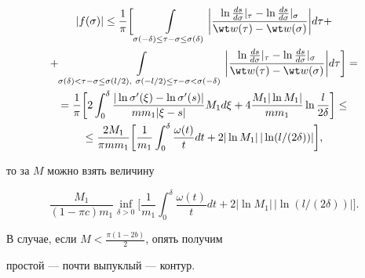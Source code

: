 \begin{multline*}


|f(\sigma)| \leq \frac{1}{\pi} \bigg[ \int\limits_{\sigma(- \delta) \leq\tau


- \sigma \leq \sigma(\delta)} \bigg| \frac{\ln


\frac{ds}{d\sigma}|_{\tau} - \ln


\frac{ds}{d\sigma}|_{\sigma}}{\wt w(\tau) - \wt w(\sigma)} \bigg|


d\tau + \\


%


+ \int\limits_{\sigma(\delta) < \tau - \sigma \leq \sigma(l/2),


\ \sigma(-l/2) \leq \tau-\sigma < \sigma(- \delta)}


\bigg| \frac{\ln \frac{ds}{d\sigma}|_{\tau} -


\ln \frac{ds}{d\sigma}|_{\sigma}}{\wt w(\tau) -


\wt w(\sigma)} \bigg| d\tau \bigg] = \\


%


= \frac {1}{\pi} \bigg[ 2\int_0^{\delta} \frac{|\ln \sigma'(\xi)


- \ln \sigma'(s)|}{m m_1 |\xi - s|} M_1 d\xi +


4 \frac{M_1 |\ln M_1|}{m m_1} \ln \frac{l}{2\delta} \bigg] \leq \\


%


\leq \frac{2 M_1}{\pi m m_1}


\bigg[ \frac{1}{m_1}\int_0^{\delta}\frac{\omega(t)}{t} dt


+ 2|\ln M_1|\, |\ln(l/(2\delta))| \bigg],


\end{multline*}


то за $M$ можно взять величину


$$


\frac{M_1}{(1 - \pi c) m_1} \inf_{\delta > 0}


\bigg[ \frac{1}{m_1}\int_0^{\delta}\frac{\omega(t)}{t} dt


+ 2|\ln M_1|\, |\ln(l/(2\delta))| \bigg] .


$$


В случае, если $M < \frac{\pi (1 - 2b)}{2}$, опять получим


простой --- почти выпуклый --- контур.






